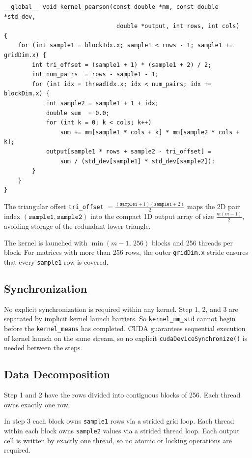 \documentclass[11pt,a4paper]{article}
\begin{document}
\begin{lstlisting}[caption={Pearson correlation kernel}]
__global__ void kernel_pearson(const double *mm, const double *std_dev,
                                double *output, int rows, int cols)
{
    for (int sample1 = blockIdx.x; sample1 < rows - 1; sample1 += gridDim.x) {
        int tri_offset = (sample1 + 1) * (sample1 + 2) / 2;
        int num_pairs  = rows - sample1 - 1;
        for (int idx = threadIdx.x; idx < num_pairs; idx += blockDim.x) {
            int sample2 = sample1 + 1 + idx;
            double sum  = 0.0;
            for (int k = 0; k < cols; k++)
                sum += mm[sample1 * cols + k] * mm[sample2 * cols + k];
            output[sample1 * rows + sample2 - tri_offset] =
                sum / (std_dev[sample1] * std_dev[sample2]);
        }
    }
}
\end{lstlisting}

The triangular offset \texttt{tri\_offset} $= \frac{(\texttt{sample1}+1)(\texttt{sample1}+2)}{2}$ maps the 2D pair index $(\texttt{sample1}, \texttt{sample2})$ into the compact 1D output array of size $\frac{m(m-1)}{2}$, avoiding storage of the redundant lower
triangle.

The kernel is launched with $\min(m-1,\,256)$ blocks and 256 threads per block. For
matrices with more than 256 rows, the outer \texttt{gridDim.x} stride ensures that every
\texttt{sample1} row is covered.

\subsection{Synchronization}

No explicit synchronization is required within any kernel. Step 1, 2, and 3 are separated by implicit kernel launch barriers. So \texttt{kernel\_mm\_std} cannot begin before the \texttt{kernel\_means} has completed. CUDA guarantees sequential execution of kernel launch on the same stream, so no explicit \texttt{cudaDeviceSynchronize()} is needed between the steps.

\subsection{Data Decomposition}

Step 1 and 2 have the rows divided into contiguous blocks of 256. Each thread owns exactly one row.

In step 3 each block owns \texttt{sample1} rows via a strided grid loop. Each thread within each block owns \texttt{sample2} values via a strided thread loop. Each output cell is written by exactly one thread, so no atomic or locking operations are required.
\end{document}
